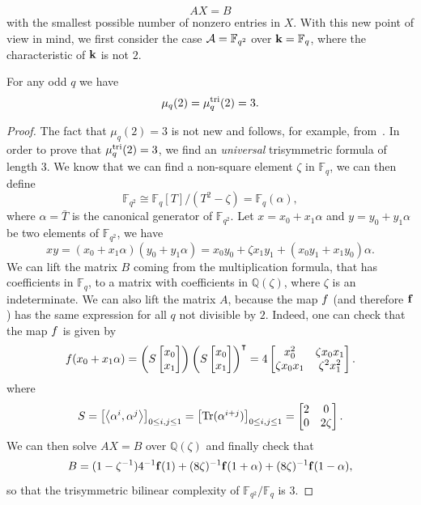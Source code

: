\[
  AX = B
\]
with the smallest possible number of nonzero entries in $X$. With this new point
of view in mind, we first consider the case $\mathcal{A}=\mathbb{F}_{q^2}$ over
$\mathbf{k}=\mathbb{F}_q$, where the characteristic of $\mathbf{k}$ is not $2$.
\begin{prop}
For any odd $q$ we have
\[
  \mu_q(2) = \mu^{\textrm{tri}}_q(2) = 3.
\]
\end{prop}
\begin{proof}
The fact that $\mu_q(2)=3$ is not new and follows, for example, from~\cite[Thm.
2.2]{BCPRRR19}. In order to prove that
$\mu^{\textrm{tri}}_q(2) = 3$, we find an \emph{universal} trisymmetric formula of length
$3$. We know that we can find a non-square element $\zeta$ in $\mathbb{F}_q$, we
can then define
\[
  \mathbb{F}_{q^2}\cong\mathbb{F}_q[T]/(T^2-\zeta)=\mathbb{F}_{q}(\alpha),
\]
where $\alpha=\bar T$ is the canonical generator of $\mathbb{F}_{q^2}$. Let $x =
x_0 + x_1\alpha$ and $y = y_0 + y_1\alpha$ be two elements of
$\mathbb{F}_{q^2}$, we have
\[
  xy = (x_0+x_1\alpha)(y_0+y_1\alpha)=x_0y_0+\zeta x_1y_1
  +(x_0y_1+x_1y_0)\alpha.
\]
We can lift the matrix $B$ coming from
the multiplication formula, that has coefficients in $\mathbb{F}_{q}$, to a
matrix with coefficients in $\mathbb{Q}(\zeta)$, where $\zeta$ is an
indeterminate. We can also lift the matrix $A$, because the map
$f$ (and therefore $\mathbf{f}$) has the same expression for all $q$ not divisible by
$2$.
Indeed, one can check that the map $f$ is given by
\[
  f(x_0+x_1\alpha)=
  \left(S
  \begin{bmatrix}
    x_0 \\
    x_1
  \end{bmatrix}\right)
  \left(S
  \begin{bmatrix}
    x_0 \\
    x_1
  \end{bmatrix}\right)^\intercal
  =
  4\begin{bmatrix}
   x_0^2 & \zeta x_0x_1 \\
   \zeta x_0 x_1 & \zeta^2 x_1^2
  \end{bmatrix}.
\]
where
\[
  S =
  \begin{bmatrix}
    \left\langle\alpha^i,\alpha^j\right\rangle
  \end{bmatrix}_{0\leq i, j\leq 1}
  =
  \begin{bmatrix}
    \operatorname{Tr}(\alpha^{i+j})
  \end{bmatrix}_{0\leq i, j\leq 1}
  =
  \begin{bmatrix}
   2 & 0 \\
   0 & 2\zeta
  \end{bmatrix}.
\]
We can then solve $AX=B$ over
$\mathbb{Q}(\zeta)$ and finally check that
\[
  B = (1-\zeta^{-1})4^{-1}\mathbf{f}(1) +
  (8\zeta)^{-1}\mathbf{f}(1+\alpha)+(8\zeta)^{-1}\mathbf{f}(1-\alpha),
\]
so that the trisymmetric bilinear complexity of
$\mathbb{F}_{q^2}/\mathbb{F}_{q}$ is $3$.
\end{proof}
